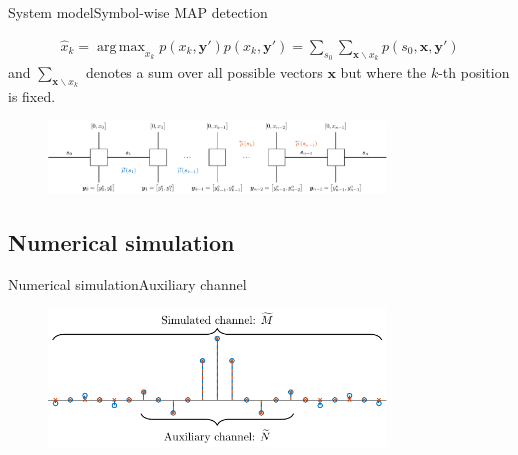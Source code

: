 \documentclass[en]{sdqbeamer}
\DeclareMathOperator*{\argmax}{arg\,max}
\begin{document}
\begin{frame}{System model}{Symbol-wise MAP detection}

\begin{align}
\hat{x}_k=\argmax_{x_k}p(x_k,\bm y')
p(x_k,\bm y')=\sum_{s_0}\sum_{\bm x\backslash x_k} p(s_0,\bm x, \bm y')
\label{eq:APPs}
\end{align}
and $\sum_{\bm x\backslash x_k}$ denotes a sum over all possible vectors $\bm x$  but where the $k$-th position is fixed.


\begin{figure}[htbp]
\begin{center}
\includegraphics[width=0.8\textwidth]{BCJR.pdf}
\end{center}
\end{figure}
\end{frame}


\subsection{Numerical simulation}

\begin{frame}{Numerical simulation}{Auxiliary channel}

\begin{figure}[htbp]
\begin{center}
\includegraphics[width=0.8\textwidth]{aux_channel.pdf}
\end{center}
\end{figure}


\end{frame}
\end{document}
